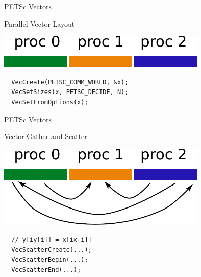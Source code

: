 


\begin{frame}[fragile]{PETSc Vectors}

 \begin{block}{Parallel Vector Layout}
   \begin{center}
     \includegraphics[width=0.75\textwidth]{figures/vectors} \\[2em]
   \end{center}
\begin{lstlisting}
  VecCreate(PETSC_COMM_WORLD, &x);
  VecSetSizes(x, PETSC_DECIDE, N);
  VecSetFromOptions(x);
\end{lstlisting}
  \vspace*{2.3cm}
 \end{block}

\end{frame}

\begin{frame}[fragile]{PETSc Vectors}

 \begin{block}{Vector Gather and Scatter}
   \begin{center}
     \includegraphics[width=0.75\textwidth]{figures/vectors-scatter} \\[1em]
\begin{lstlisting}
  // y[iy[i]] = x[ix[i]]
  VecScatterCreate(...);
  VecScatterBegin(...);
  VecScatterEnd(...);
\end{lstlisting}
   \end{center}
 \end{block}

\end{frame}



